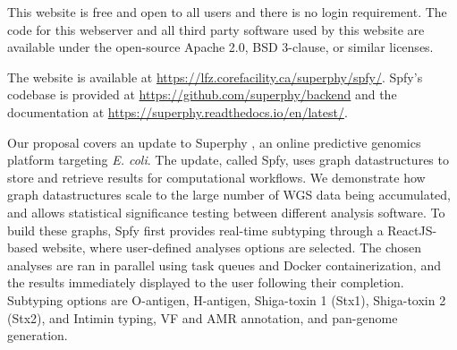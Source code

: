 


This website is free and open to all users and there is no login requirement. The code for this webserver and all third party software used by this website are available under the open-source Apache 2.0, BSD 3-clause, or similar licenses.

The website is available at \url{https://lfz.corefacility.ca/superphy/spfy/}. Spfy's codebase is provided at \url{https://github.com/superphy/backend} and the documentation at \url{https://superphy.readthedocs.io/en/latest/}.

Our proposal covers an update to Superphy \citep{whiteside2016superphy}, an online predictive genomics platform targeting \textit{E. coli}.
The update, called Spfy, uses graph datastructures to store and retrieve results for computational workflows.
We demonstrate how graph datastructures scale to the large number of WGS data being accumulated, and allows statistical significance testing between different analysis software.
To build these graphs, Spfy first provides real-time subtyping through a ReactJS-based website, where user-defined analyses options are selected. 
The chosen analyses are ran in parallel using task queues and Docker containerization, and the results immediately displayed to the user following their completion.
Subtyping options are O-antigen, H-antigen, Shiga-toxin 1 (Stx1), Shiga-toxin 2 (Stx2), and Intimin typing, VF and AMR annotation, and pan-genome generation.

